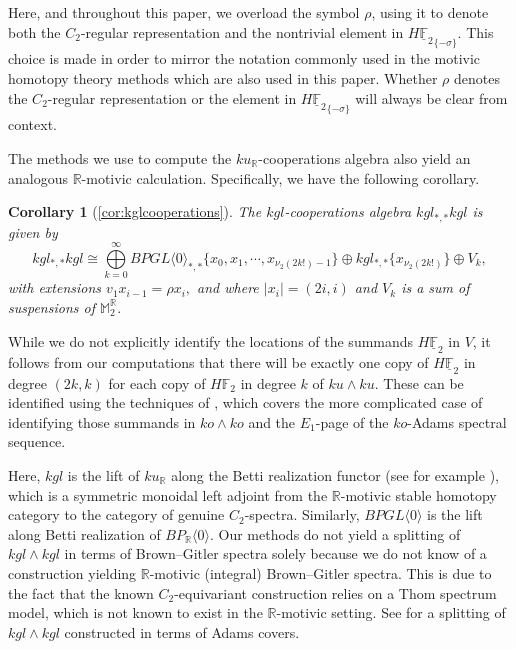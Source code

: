 \documentclass{amsart}
\newtheorem*{cor*}{Corollary}
\theoremstyle{plain}
\numberwithin{equation}{section}
\numberwithin{figure}{section}
\newcommand{\mF}{{\mathbb F}}
\newcommand{\mM}{{\mathbb M}}
\newcommand{\mR}{{\mathbb R}}
\newcommand{\umF}{\underline{\mF}}
\newcommand{\0}{\langle 0 \rangle }
\begin{document}
Here, and throughout this paper, we overload the symbol $\rho$, using it to denote both the $C_2$-regular representation and the nontrivial element in ${H \umF_2}_{\{-\sigma\}}$. This choice is made in order to mirror the notation commonly used in the motivic homotopy theory methods which are also used in this paper. Whether $\rho$ denotes the $C_2$-regular representation or the element in ${H \umF_2}_{\{-\sigma\}}$ will always be clear from context.

The methods we use to compute the $ku_\mR$-cooperations algebra also yield an analogous $\mR$-motivic calculation. Specifically, we have the following corollary.

\begin{cor*}[\cref{cor:kglcooperations}]
     The $kgl$-cooperations algebra $kgl_{*,*} kgl$ is given by 
    \[
        kgl_{*,*} kgl \cong \bigoplus\limits_{k=0}^\infty BPGL \langle 0 \rangle_{*,*} \{ x_0, x_1, \cdots, x_{\nu_2 (2k!) - 1} \} \oplus kgl_{*, *} \{ x_{ \nu_2 (2k!)} \} \oplus V_k,
    \]
    with extensions $v_1 x_{i - 1} = \rho x_i,$ and where $\vert x_i \vert = (2i, i)$ and $V_k$ is a sum of suspensions of $\mM_2^\mR.$
\end{cor*}

While we do not explicitly identify the locations of the summands $H\umF_2$ in $V$, it follows from our computations that there will be exactly one copy of  $H\umF_2$ in degree $(2k,k)$ for each copy of $H\mF_2$ in degree $k$ of $ku \wedge ku$. These can be identified using the techniques of \cite{carlsson1980stable}, which covers the more complicated case of identifying those summands in $ko \wedge ko$ and the $E_1$-page of the $ko$-Adams spectral sequence. 

Here, $kgl$ is the lift of $ku_\mR$ along the Betti realization functor (see for example \cite[Section 4.4]{HellerOrmsby16}), which is a symmetric monoidal left adjoint from the $\mR$-motivic stable homotopy category to the category of genuine $C_2$-spectra. Similarly, $BPGL \langle 0 \rangle$ is the lift along Betti realization of $BP_\mR \langle 0 \rangle.$ Our methods do not yield a splitting of $kgl \wedge kgl$ in terms of Brown--Gitler spectra solely because we do not know of a construction yielding $\mR$-motivic (integral) Brown--Gitler spectra. This is due to the fact that the known $C_2$-equivariant construction relies on a Thom spectrum model, which is not known to exist in the $\mR$-motivic setting. See \cite{MorrisPetersenTatum2025} for a splitting of $kgl \wedge kgl$ constructed in terms of Adams covers. 
\end{document}
